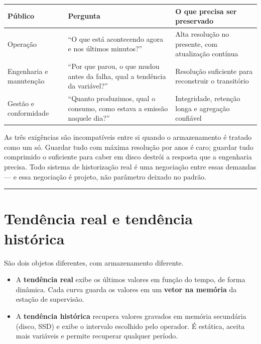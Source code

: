 \begin{longtable}[]{@{}
  >{\raggedright\arraybackslash}p{}
  >{\raggedright\arraybackslash}p{}
  >{\raggedright\arraybackslash}p{}@{}}
\toprule\noalign{}
\begin{minipage}[b]{\linewidth}\raggedright
Público
\end{minipage} & \begin{minipage}[b]{\linewidth}\raggedright
Pergunta
\end{minipage} & \begin{minipage}[b]{\linewidth}\raggedright
O que precisa ser preservado
\end{minipage} \\
\midrule\noalign{}
\endhead
\bottomrule\noalign{}
\endlastfoot
Operação & ``O que está acontecendo agora e nos últimos minutos?'' & Alta resolução no presente, com atualização contínua \\
Engenharia e manutenção & ``Por que parou, o que mudou antes da falha, qual a tendência da variável?'' & Resolução suficiente para reconstruir o transitório \\
Gestão e conformidade & ``Quanto produzimos, qual o consumo, como estava a emissão naquele dia?'' & Integridade, retenção longa e agregação confiável \\
\end{longtable}

As três exigências são incompatíveis entre si quando o armazenamento é tratado como um só. Guardar
tudo com máxima resolução por anos é caro; guardar tudo comprimido o suficiente para caber em disco
destrói a resposta que a engenharia precisa. Todo sistema de historização real é uma negociação
entre essas demandas --- e essa negociação é projeto, não parâmetro deixado no padrão.

\begin{center}\rule{0.5\linewidth}{0.5pt}\end{center}

\section{Tendência real e tendência histórica}\label{tenduxeancia-real-e-tenduxeancia-histuxf3rica}

São dois objetos diferentes, com armazenamento diferente.

\begin{itemize}
\tightlist
\item
  A \textbf{tendência real} exibe os últimos valores em função do tempo, de forma dinâmica. Cada curva
  guarda os valores em um \textbf{vetor na memória} da estação de supervisão.
\item
  A \textbf{tendência histórica} recupera valores gravados em memória secundária (disco, SSD) e exibe o
  intervalo escolhido pelo operador. É estática, aceita mais variáveis e permite recuperar qualquer
  período.
\end{itemize}

